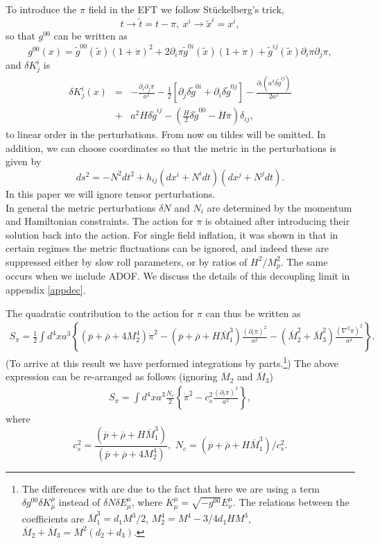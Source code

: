 \documentclass[11pt,amsmath,floats,floatfix,nofootinbib,secnumarabic, superscriptaddress, tightenlines]{revtex4}
\newcommand{\beq}{\begin{equation}}
\newcommand{\eeq}{\end{equation}}
\newcommand{\nn}{\nonumber}
\newcommand{\be}{\begin{equation}}
\newcommand{\ee}{\end{equation}}
\begin{document}
{To introduce the $\pi$ field  in the EFT we follow St\"uckelberg's trick,
\beq
t \to \tilde{t}=t-\pi,~ x^i\to \tilde{x}^i=x^i,\label{pionstx}\eeq
so that $g^{00}$ can be written as
\begin{equation}
\label{pionstx2}
g^{00}(x)=\tilde{g}^{00}(\tilde{x}) (1+\dot{\pi})^2+2 \partial_i\pi \tilde{g}^{0i}(\tilde{x})(1+\dot{\pi})+\tilde{g}^{ij}(\tilde{x}) \partial_i\pi\partial_j\pi,
\end{equation} and $\delta K^{i}_{j}$ is
\begin{eqnarray}
\delta K^{i}_{j}(x)&=&-\frac{\partial_i\partial_j\pi}{a^2}-\frac{1}{2}[\partial_j \delta\tilde{g}^{0i}+\partial_i \delta\tilde{g}^{0j}]-\frac{\partial_t(a^4\delta\tilde{g}^{ij})}{2 a^2}\nn \\ &+& a^2 H\delta\tilde{g}^{ij}-\left(\frac{H}{2}\delta\tilde{g}^{00}-\dot{H}\pi\right)\delta_{ij},
\end{eqnarray}
to linear order in the perturbations. From now on tildes will be omitted.  In addition, we can choose coordinates so that  the metric in the perturbations is given by
\be ds^2=-N^2dt^2+h_{ij} (dx^i+N^i dt) (dx^j+N^j dt).\ee
In this paper we will ignore tensor perturbations.\\

In general the metric perturbations $\delta N$ and $N_i$ are determined by the momentum and Hamiltonian constraints. The action for $\pi$ is obtained after introducing their solution back into the action. For single field inflation, it was shown in \cite{eft1} that in certain regimes the metric fluctuations can be ignored, and indeed these are suppressed either by slow roll parameters, or by ratios of $H^2/M_p^2$. The same occurs when we include ADOF. We discuss the details of this decoupling limit in appendix \ref{appdec}. 

The quadratic contribution to the action for $\pi$ can thus be written as
\begin{eqnarray}\label{cuad}
S_{\pi}=\frac{1}{2}\int d^4x a^3\left\{(\overline{p}+\overline{\rho}+4M_2^4)\dot{\pi}^2-(\overline{p}+\overline{\rho}+H\overline{M}_1^3)\frac{(\partial_i\pi)^2}{a^2}-(\overline{M}^2_2+\overline{M}^2_3)\frac{(\nabla^2\pi)^2}{a^4}\right\}.
\end{eqnarray}
(To arrive at this result we have performed integrations by parts.\footnote{The differences with \cite{eft1} are due to the fact that here we are using  a term $\delta g^{00}\delta K^{\mu}_{\mu}$ instead of $\delta N\delta E^{\mu}_{\mu}$, where $K^{\mu}_{\mu}=\sqrt{-g^{00}}E^{\mu}_{\nu}$. The relations between the coefficients are $\overline{M}_1^3=d_1 M^3/2$, $M^4_2=M^4-3/4 d_1 H M^3$, $\overline{M}_2+\overline{M}_3=M^2(d_2+d_3)$.}) The above expression can be re-arranged as follows (ignoring $\overline{M}_2$ and $\overline{M}_3$)
\begin{eqnarray}\label{l2pi}
S_{\pi}=\int d^4x a^3\frac{N_c}{2}\left\{\dot{\pi}^2-c_s^2\frac{(\partial_i\pi)^2}{a^2}\right\},
\end{eqnarray}where \beq \label{ncs} c_s^2=\frac{(\overline{p}+\overline{\rho}+H\overline{M}_1^3)}{(\overline{p}+\overline{\rho}+4M_2^4)},\,\, N_c=(\overline{p}+\overline{\rho}+H\overline{M}_1^3)/c_s^2.\eeq

}
\end{document}
